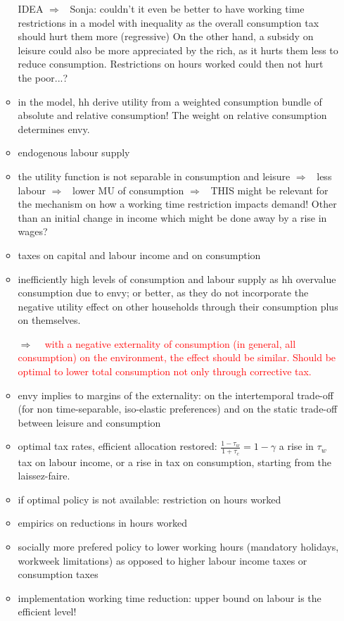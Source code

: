 \documentclass[12pt]{article}
\newcommand{\ar}{$\Rightarrow$ \ }
\newcommand{\tr}[1]{\textcolor{red}{#1}}
\begin{document}
\begin{itemize}
\begin{itemize}
IDEA \ar Sonja: couldn't it even be better to have working time restrictions in a model with inequality as the overall consumption tax should hurt them more (regressive) On the other hand, a subsidy on leisure could also be more appreciated by the rich, as it hurts them less to reduce consumption. Restrictions on hours worked could then not hurt the poor...?
\item in the model, hh derive utility from a weighted consumption bundle of absolute and relative consumption! The weight on relative consumption determines envy.
\item endogenous labour supply
\item the utility function is not separable in consumption and leisure \ar less labour \ar lower MU of consumption \ar THIS might be relevant for the mechanism on how a working time restriction impacts demand! Other than an initial change in income which might be done away by a rise in wages?
\item taxes on capital and labour income and on consumption
\item inefficiently high levels of consumption and labour supply as hh overvalue consumption due to envy; or better, as they do not incorporate the negative utility effect on other households through their consumption plus on themselves. 
\item[\ar] \tr{with a negative externality of consumption (in general, all consumption) on the environment, the effect should be similar. Should be optimal to lower total consumption not only through corrective tax. }
\item envy implies to margins of the externality: on the intertemporal trade-off (for non time-separable, iso-elastic preferences) and on the static trade-off between leisure and consumption
\item optimal tax rates, efficient allocation restored: $\frac{1-\tau_w}{1+\tau_c}=1-\gamma$ a rise in $\tau_w$ tax on labour income, or a rise in tax on consumption, starting from the laissez-faire. 
\item if optimal policy is not available: restriction on hours worked
\item empirics on reductions in hours worked
\item socially more prefered policy to lower working hours (mandatory holidays, workweek limitations) as opposed to higher labour income taxes or consumption taxes
\item implementation working time reduction: upper bound on labour is the efficient level! 

\end{itemize}
\end{itemize}
\end{document}
